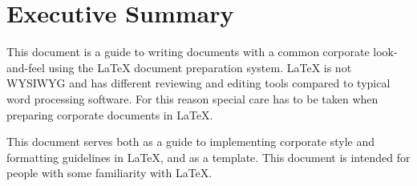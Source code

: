 \chapter*{Executive Summary}
This document is a guide to writing documents with a common corporate look-and-feel using the LaTeX document preparation system. LaTeX is not WYSIWYG and has different reviewing and editing tools compared to typical word processing software. For this reason special care has to be taken when preparing corporate documents in LaTeX. 

This document serves both as a guide to implementing corporate style and formatting guidelines in LaTeX, and as a template. This document is intended for people with some familiarity with LaTeX.